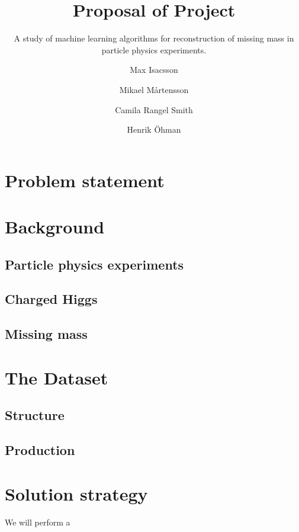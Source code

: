 \documentclass{scrartcl}
\title{Proposal of Project}
\subtitle{A study of machine learning algorithms for reconstruction of missing mass in particle physics experiments.}
\author[1]{Max Isacsson}
\author[2]{Mikael M\aa rtensson}
\author[3]{Camila Rangel Smith}
\author[4]{Henrik \"{O}hman}
\affil[1]{\small\url{max.isacsson@physics.uu.se}}
\affil[2]{\url{mikael.martensson@physics.uu.se}}
\affil[3]{\url{camila.rangel@physics.uu.se}}
\affil[4]{\url{ohman@cern.ch}}
\begin{document}
\maketitle

\section{Problem statement}


\section{Background}
\subsection{Particle physics experiments}

\subsection{Charged Higgs}
\subsection{Missing mass}


\section{The Dataset}
\subsection{Structure}

\subsection{Production}


\section{Solution strategy}
We will perform a 


% 
\end{document}
